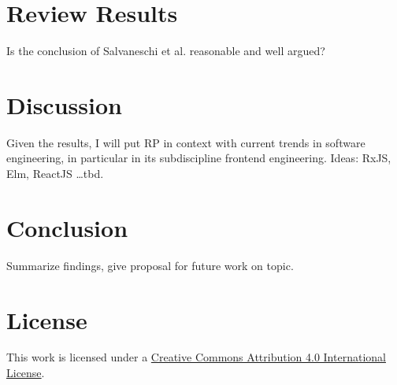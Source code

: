 \documentclass[11pt,a4paper,twocolumn]{article}
\begin{document}
	\section{Review Results}
	Is the conclusion of Salvaneschi et al. \cite{7827078} reasonable and well argued?



	\section{Discussion}
	Given the results, I will put RP in context with current trends in software engineering, in particular in its subdiscipline frontend engineering.
	Ideas: RxJS, Elm, ReactJS \dots tbd.

	\section{Conclusion}
	Summarize findings, give proposal for future work on topic.

	
	

	\section*{License}
	\ccby\thinspace\thinspace This work is licensed under a \href{https://creativecommons.org/licenses/by/4.0/}{Creative Commons Attribution 4.0 International License}.
\end{document}
